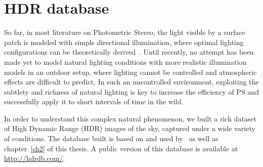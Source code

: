 



\section{HDR database}
\label{sec:hdrdb}

So far, in most literature on Photometric Stereo, the light visible by a surface patch is modeled with simple directional illumination, where optimal lighting configurations can be theoretically derived~\cite{drbohlav-iccv-05,klaudiny-prl-14,shen-pg-14}. Until recently, no attempt has been made yet to model natural lighting conditions with more realistic illumination models in an outdoor setup, where lighting cannot be controlled and atmospheric effects are difficult to predict. In such an uncontrolled environment, exploiting the subtlety and richness of natural lighting is key to increase the efficiency of PS and successfully apply it to short intervals of time in the wild.

In order to understand this complex natural phenomenon, we built a rich dataset of High Dynamic Range (HDR) images of the sky, captured under a wide variety of conditions. The database built is based on and used by~\cite{lalonde-3dv-14,holdgeoffroy-iccp-15,holdgeoffroy-3dv-15} as well as chapter~\ref{ch2} of this thesis. A public version of this database is available at \url{http://hdrdb.com/}.

